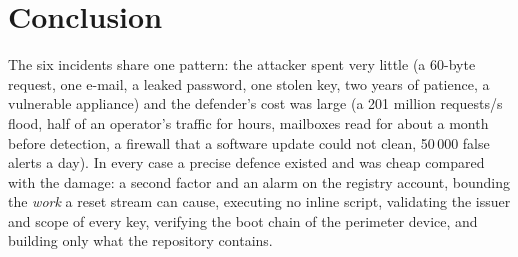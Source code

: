 \documentclass[11pt,a4paper]{article}
\begin{document}
\section*{Conclusion}
The six incidents share one pattern: the attacker spent very little (a 60-byte request, one e-mail, a leaked password, one stolen key, two years of
patience, a vulnerable appliance) and the defender's cost was large (a 201 million requests/s flood, half of an operator's traffic for hours, mailboxes read for about a month before detection,
a firewall that a software update could not clean, 50\,000 false alerts a day). In every case a precise defence existed and was cheap compared with the damage: a second
factor and an alarm on the registry account, bounding the \emph{work} a reset stream can cause, executing no inline script, validating the issuer and scope of every key, verifying the
boot chain of the perimeter device, and building only what the repository contains.
\end{document}
